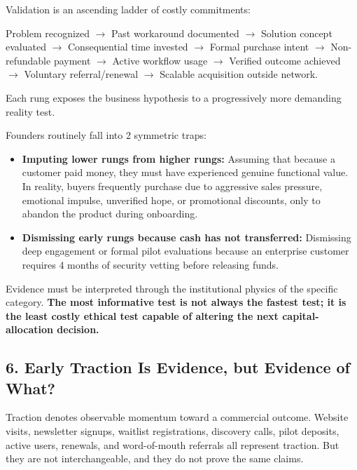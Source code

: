 Validation is an ascending ladder of costly commitments:

\begin{center}
Problem recognized $\rightarrow$ Past workaround documented $\rightarrow$ Solution concept evaluated $\rightarrow$ Consequential time invested $\rightarrow$ Formal purchase intent $\rightarrow$ Non-refundable payment $\rightarrow$ Active workflow usage $\rightarrow$ Verified outcome achieved $\rightarrow$ Voluntary referral/renewal $\rightarrow$ Scalable acquisition outside network.
\end{center}

Each rung exposes the business hypothesis to a progressively more demanding reality test.

Founders routinely fall into 2 symmetric traps:
\begin{itemize}
    \item \textbf{Imputing lower rungs from higher rungs:} Assuming that because a customer paid money, they must have experienced genuine functional value. In reality, buyers frequently purchase due to aggressive sales pressure, emotional impulse, unverified hope, or promotional discounts, only to abandon the product during onboarding.
    \item \textbf{Dismissing early rungs because cash has not transferred:} Dismissing deep engagement or formal pilot evaluations because an enterprise customer requires 4 months of security vetting before releasing funds.
\end{itemize}

Evidence must be interpreted through the institutional physics of the specific category. \textbf{The most informative test is not always the fastest test; it is the least costly ethical test capable of altering the next capital-allocation decision.}

\subsection*{6. Early Traction Is Evidence, but Evidence of What?}

Traction denotes observable momentum toward a commercial outcome. Website visits, newsletter signups, waitlist registrations, discovery calls, pilot deposits, active users, renewals, and word-of-mouth referrals all represent traction. But they are not interchangeable, and they do not prove the same claims.

